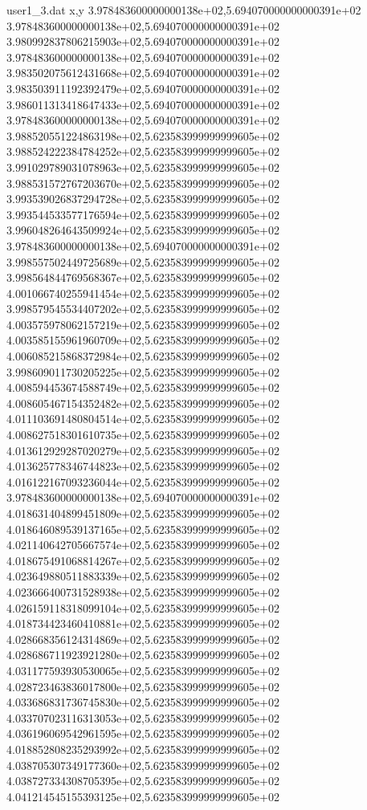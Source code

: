 \begin{filecontents}{user1_3.dat}
x,y
3.978483600000000138e+02,5.694070000000000391e+02
3.978483600000000138e+02,5.694070000000000391e+02
3.980992837806215903e+02,5.694070000000000391e+02
3.978483600000000138e+02,5.694070000000000391e+02
3.983502075612431668e+02,5.694070000000000391e+02
3.983503911192392479e+02,5.694070000000000391e+02
3.986011313418647433e+02,5.694070000000000391e+02
3.978483600000000138e+02,5.694070000000000391e+02
3.988520551224863198e+02,5.623583999999999605e+02
3.988524222384784252e+02,5.623583999999999605e+02
3.991029789031078963e+02,5.623583999999999605e+02
3.988531572767203670e+02,5.623583999999999605e+02
3.993539026837294728e+02,5.623583999999999605e+02
3.993544533577176594e+02,5.623583999999999605e+02
3.996048264643509924e+02,5.623583999999999605e+02
3.978483600000000138e+02,5.694070000000000391e+02
3.998557502449725689e+02,5.623583999999999605e+02
3.998564844769568367e+02,5.623583999999999605e+02
4.001066740255941454e+02,5.623583999999999605e+02
3.998579545534407202e+02,5.623583999999999605e+02
4.003575978062157219e+02,5.623583999999999605e+02
4.003585155961960709e+02,5.623583999999999605e+02
4.006085215868372984e+02,5.623583999999999605e+02
3.998609011730205225e+02,5.623583999999999605e+02
4.008594453674588749e+02,5.623583999999999605e+02
4.008605467154352482e+02,5.623583999999999605e+02
4.011103691480804514e+02,5.623583999999999605e+02
4.008627518301610735e+02,5.623583999999999605e+02
4.013612929287020279e+02,5.623583999999999605e+02
4.013625778346744823e+02,5.623583999999999605e+02
4.016122167093236044e+02,5.623583999999999605e+02
3.978483600000000138e+02,5.694070000000000391e+02
4.018631404899451809e+02,5.623583999999999605e+02
4.018646089539137165e+02,5.623583999999999605e+02
4.021140642705667574e+02,5.623583999999999605e+02
4.018675491068814267e+02,5.623583999999999605e+02
4.023649880511883339e+02,5.623583999999999605e+02
4.023666400731528938e+02,5.623583999999999605e+02
4.026159118318099104e+02,5.623583999999999605e+02
4.018734423460410881e+02,5.623583999999999605e+02
4.028668356124314869e+02,5.623583999999999605e+02
4.028686711923921280e+02,5.623583999999999605e+02
4.031177593930530065e+02,5.623583999999999605e+02
4.028723463836017800e+02,5.623583999999999605e+02
4.033686831736745830e+02,5.623583999999999605e+02
4.033707023116313053e+02,5.623583999999999605e+02
4.036196069542961595e+02,5.623583999999999605e+02
4.018852808235293992e+02,5.623583999999999605e+02
4.038705307349177360e+02,5.623583999999999605e+02
4.038727334308705395e+02,5.623583999999999605e+02
4.041214545155393125e+02,5.623583999999999605e+02

\end{filecontents}
